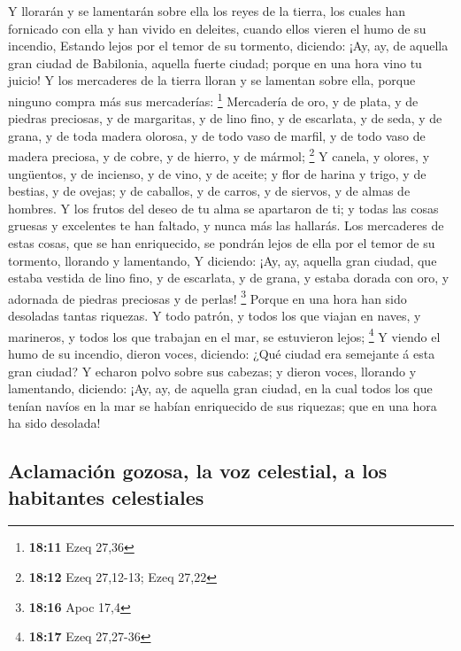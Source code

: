  Y llorarán y se lamentarán sobre ella los reyes de la
tierra, los cuales han fornicado con ella y han vivido en deleites,
cuando ellos vieren el humo de su incendio,  Estando lejos
por el temor de su tormento, diciendo: ¡Ay, ay, de aquella gran ciudad
de Babilonia, aquella fuerte ciudad; porque en una hora vino tu juicio!
 Y los mercaderes de la tierra lloran y se lamentan sobre
ella, porque ninguno compra más sus mercaderías: \footnote{\textbf{18:11}
  Ezeq 27,36}  Mercadería de oro, y de plata, y de piedras
preciosas, y de margaritas, y de lino fino, y de escarlata, y de seda, y
de grana, y de toda madera olorosa, y de todo vaso de marfil, y de todo
vaso de madera preciosa, y de cobre, y de hierro, y de mármol;
\footnote{\textbf{18:12} Ezeq 27,12-13; Ezeq 27,22}  Y
canela, y olores, y ungüentos, y de incienso, y de vino, y de aceite; y
flor de harina y trigo, y de bestias, y de ovejas; y de caballos, y de
carros, y de siervos, y de almas de hombres.  Y los frutos
del deseo de tu alma se apartaron de ti; y todas las cosas gruesas y
excelentes te han faltado, y nunca más las hallarás.  Los
mercaderes de estas cosas, que se han enriquecido, se pondrán lejos de
ella por el temor de su tormento, llorando y lamentando,  Y
diciendo: ¡Ay, ay, aquella gran ciudad, que estaba vestida de lino fino,
y de escarlata, y de grana, y estaba dorada con oro, y adornada de
piedras preciosas y de perlas! \footnote{\textbf{18:16} Apoc 17,4}
 Porque en una hora han sido desoladas tantas riquezas. Y
todo patrón, y todos los que viajan en naves, y marineros, y todos los
que trabajan en el mar, se estuvieron lejos; \footnote{\textbf{18:17}
  Ezeq 27,27-36}  Y viendo el humo de su incendio, dieron
voces, diciendo: ¿Qué ciudad era semejante á esta gran ciudad?
 Y echaron polvo sobre sus cabezas; y dieron voces,
llorando y lamentando, diciendo: ¡Ay, ay, de aquella gran ciudad, en la
cual todos los que tenían navíos en la mar se habían enriquecido de sus
riquezas; que en una hora ha sido desolada!

\hypertarget{aclamaciuxf3n-gozosa-la-voz-celestial-a-los-habitantes-celestiales}{%
\subsection{Aclamación gozosa, la voz celestial, a los habitantes
celestiales}\label{aclamaciuxf3n-gozosa-la-voz-celestial-a-los-habitantes-celestiales}}

